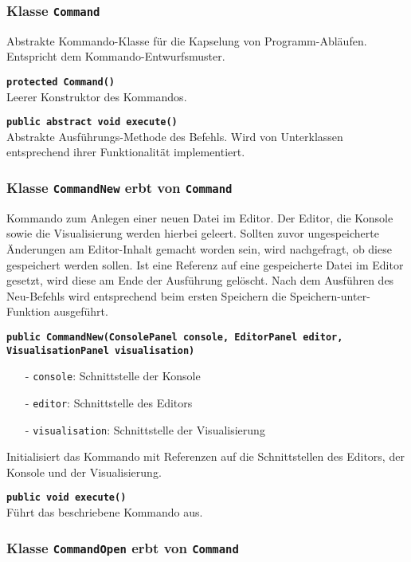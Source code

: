 \documentclass[parskip=full,11pt,twoside]{scrartcl}
\begin{document}
\subsubsection{Klasse \texttt{Command}}

Abstrakte Kommando-Klasse für die Kapselung von Programm-Abläufen. Entspricht dem Kommando-Entwurfsmuster.

\textbf{\texttt{protected Command()}}\\
Leerer Konstruktor des Kommandos.

\textbf{\texttt{public abstract void execute()}}\\
Abstrakte Ausführungs-Methode des Befehls. Wird von Unterklassen entsprechend ihrer Funktionalität implementiert.

\subsubsection{Klasse \texttt{CommandNew} erbt von \texttt{Command}}

Kommando zum Anlegen einer neuen Datei im Editor. Der Editor, die Konsole sowie die Visualisierung werden hierbei geleert. Sollten zuvor ungespeicherte Änderungen am Editor-Inhalt gemacht worden sein, wird nachgefragt, ob diese gespeichert werden sollen. Ist eine Referenz auf eine gespeicherte Datei im Editor gesetzt, wird diese am Ende der Ausführung gelöscht. Nach dem Ausführen des Neu-Befehls wird entsprechend beim ersten Speichern die Speichern-unter-Funktion ausgeführt.

\textbf{\texttt{public CommandNew(ConsolePanel console, EditorPanel editor,\\VisualisationPanel visualisation)}}
\begin{itemize}[noitemsep]
	\item[-] \texttt{console}: Schnittstelle der Konsole
	\item[-] \texttt{editor}: Schnittstelle des Editors
	\item[-] \texttt{visualisation}: Schnittstelle der Visualisierung
\end{itemize}
Initialisiert das Kommando mit Referenzen auf die Schnittstellen des Editors, der Konsole und der Visualisierung.

\textbf{\texttt{public void execute()}}\\
Führt das beschriebene Kommando aus.

\subsubsection{Klasse \texttt{CommandOpen} erbt von \texttt{Command}}
\end{document}

